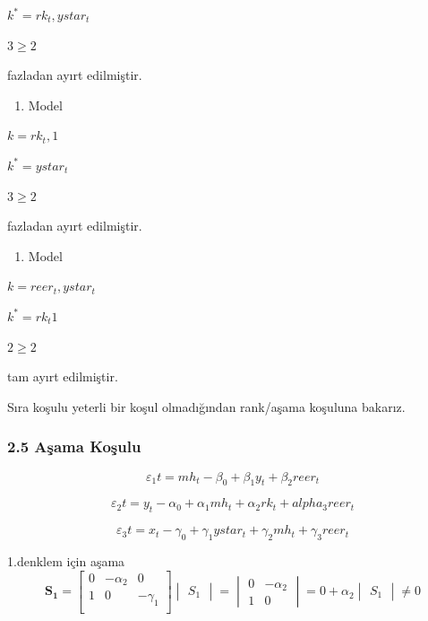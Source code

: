 \documentclass[]{article}
\providecommand{\tightlist}{%
  \setlength{\itemsep}{0pt}\setlength{\parskip}{0pt}}
\begin{document}
\(k^{*} = rk_t , ystar_t\)

\(3 \ge 2\)

fazladan ayırt edilmiştir.

\begin{enumerate}
\def\labelenumi{\arabic{enumi}.}
\setcounter{enumi}{1}
\tightlist
\item
  Model
\end{enumerate}

\(k = rk_t , 1\)

\(k^{*} = ystar _t\)

\(3 \ge 2\)

fazladan ayırt edilmiştir.

\begin{enumerate}
\def\labelenumi{\arabic{enumi}.}
\setcounter{enumi}{2}
\tightlist
\item
  Model
\end{enumerate}

\(k = reer_t , ystar_t\)

\(k^{*} = rk_t 1\)

\(2 \ge 2\)

tam ayırt edilmiştir.

Sıra koşulu yeterli bir koşul olmadığından rank/aşama koşuluna bakarız.

\subsubsection{2.5 Aşama Koşulu}\label{asama-kosulu}

\[\varepsilon_1t = mh_t - \beta_0 + \beta_1 y_t + \beta_2 reer_t\]

\[\varepsilon_2t = y_t - \alpha_0 + \alpha_1 mh_t + \alpha_2 rk_t + alpha_3 reer_t\]

\[\varepsilon_3t= x_t -\gamma_0 + \gamma_1 ystar_t + \gamma_2 mh_t + \gamma_3 reer_t\]

1.denklem için aşama \[\mathbf{S_1} = \left[\begin{array} {rrr}
0 & -\alpha_2 & 0 \\
1 & 0 & -\gamma_1 \\
\end{array}\right]    \begin{vmatrix} S_1 \end{vmatrix} =\begin{vmatrix} 0 & -\alpha_2 \\ 1 & 0 \end{vmatrix} = 0 + \alpha_2 \begin{vmatrix} S_1 \end{vmatrix} \neq 0\]
\end{document}
